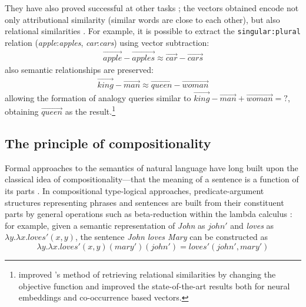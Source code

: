 They have also proved successful at other tasks \cite{mikolov2013linguistic}; the vectors obtained encode not only attributional similarity (similar words are close to each other), but also relational similarities \cite{Turney:2010:FMV:1861751.1861756}. For example, it is possible to extract the \texttt{singular:plural} relation (\textit{apple}:\textit{apples}, \textit{car}:\textit{cars}) using vector subtraction:
%
\begin{align*}
  \overrightarrow{\mathit{apple}} - \overrightarrow{\mathit{apples}}
  \approx
  \overrightarrow{\mathit{car}} - \overrightarrow{\mathit{cars}}
\end{align*}
%
also semantic relationships are preserved:
%
\begin{align*}
  \overrightarrow{\mathit{king}} - \overrightarrow{\mathit{man}}
  \approx
  \overrightarrow{\mathit{queen}} - \overrightarrow{\mathit{woman}}
\end{align*}
%
allowing the formation of analogy queries similar to
$\overrightarrow{\mathit{king}} - \overrightarrow{\mathit{man}} +
\overrightarrow{\mathit{woman}} = \mathtt{?}$, obtaining
$\overrightarrow{\mathit{queen}}$ as the
result.\footnote{ improved
  's method of retrieving relational similarities
  by changing the objective function and improved the state-of-the-art results
  both for neural embeddings and co-occurrence based vectors.}


\subsection{The principle of compositionality}
\label{sec:formal-semantics}

Formal approaches to the semantics of natural language have long built upon the
classical idea of compositionality---that the meaning of a sentence is a
function of its parts \cite{Janssen2001}. In compositional type-logical
approaches, predicate-argument structures representing phrases and sentences are
built from their constituent parts by general operations such as beta-reduction
within the lambda calculus \cite{THEO:THEO373}: for example, given a semantic
representation of \emph{John} as $\mathit{john}'$ and \emph{loves} as
$\lambda y.\lambda x.\mathit{loves}'(x, y)$, the sentence \emph{John loves Mary}
can be constructed as
$$
\lambda y.\lambda
x.\mathit{loves}'(x, y)(\mathit{mary}')(\mathit{john}') =
\mathit{loves}'(\mathit{john}', \mathit{mary}')
$$

